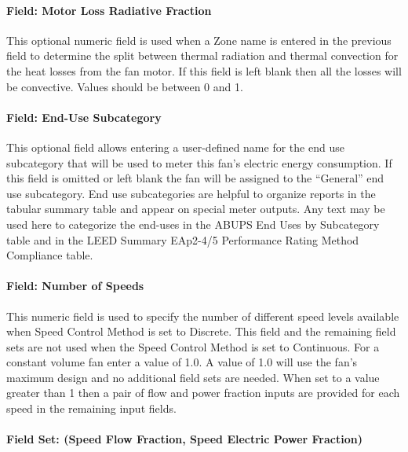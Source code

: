 \paragraph{Field: Motor Loss Radiative Fraction}\label{field-loss-rad-frac-fansysmodel}

This optional numeric field is used when a Zone name is entered in the previous field to determine the split between thermal radiation and thermal convection for the heat losses from the fan motor. If this field is left blank then all the losses will be convective.  Values should be between 0 and 1.

\paragraph{Field: End-Use Subcategory}\label{field-end-use-subcat-fansysmodel}

This optional field allows entering a user-defined name for the end use subcategory that will be used to meter this fan's electric energy consumption. If this field is omitted or left blank the fan will be assigned to the ``General'' end use subcategory.  End use subcategories are helpful to organize reports in the tabular summary table and appear on special meter outputs. Any text may be used here to categorize the end-uses in the ABUPS End Uses by Subcategory table and in the LEED Summary EAp2-4/5 Performance Rating Method Compliance table.

\paragraph{Field: Number of Speeds}\label{field-num-speeds-fansysmodel}

This numeric field is used to specify the number of different speed levels available when Speed Control Method is set to Discrete.  This field and the remaining field sets are not used when the Speed Control Method is set to Continuous.  For a constant volume fan enter a value of 1.0.  A value of 1.0 will use the fan's maximum design and no additional field sets are needed.  When set to a value greater than 1 then a pair of flow and power fraction inputs are provided for each speed in the remaining input fields.

\paragraph{Field Set: (Speed Flow Fraction, Speed Electric Power Fraction)}\label{fieldset-flow-power-fractions-fansysmodel}

